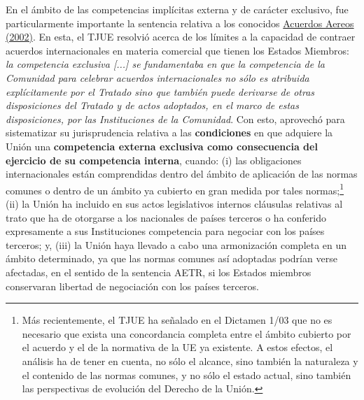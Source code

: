 \documentclass[10pt,a4paper]{article}
\begin{document}
En el ámbito de las competencias implícitas externa y de carácter exclusivo, fue particularmente importante la sentencia relativa a los conocidos \href{https://eur-lex.europa.eu/ES/legal-content/summary/air-service-agreements-between-eu-and-non-eu-countries.html}{Acuerdos Aereos (2002)}. En esta, el TJUE resolvió acerca de los límites a la capacidad de contraer acuerdos internacionales en materia comercial que tienen los Estados Miembros: \textit{la competencia exclusiva [...] se fundamentaba en que la competencia de la Comunidad para celebrar acuerdos internacionales no sólo es atribuida explícitamente por el Tratado sino que también puede derivarse de otras disposiciones del Tratado y de actos adoptados, en el marco de estas disposiciones, por las Instituciones de la Comunidad}. Con esto, aprovechó para sistematizar su jurisprudencia relativa a las \textbf{condiciones} en que adquiere la Unión una \textbf{competencia externa exclusiva como consecuencia del ejercicio de su competencia interna}, cuando: (i) las obligaciones internacionales están comprendidas dentro del ámbito de aplicación de las normas comunes o dentro de un ámbito ya cubierto en gran medida por tales normas;\footnote{%
    Más recientemente, el TJUE ha señalado en el Dictamen 1/03 que no es necesario que exista una concordancia completa entre el ámbito cubierto por el acuerdo y el de la normativa de la UE ya existente. A estos efectos, el análisis ha de tener en cuenta, no sólo el alcance, sino también la naturaleza y el contenido de las normas comunes, y no sólo el estado actual, sino también las perspectivas de evolución del Derecho de la Unión.
} (ii) la Unión ha incluido en sus actos legislativos internos cláusulas relativas al trato que ha de otorgarse a los nacionales de países terceros o ha conferido expresamente a sus Instituciones competencia para negociar con los países terceros; y, (iii) la Unión haya llevado a cabo una armonización completa en un ámbito determinado, ya que las normas comunes así adoptadas podrían verse afectadas, en el sentido de la sentencia AETR, si los Estados miembros conservaran libertad de negociación con los países terceros. 
\end{document}

